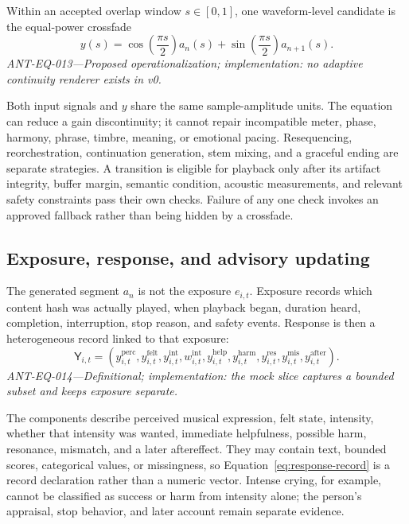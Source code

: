 Within an accepted overlap window $s\in[0,1]$, one waveform-level candidate is
the equal-power crossfade
\begin{equation}
  y(s)
  = \cos\!\left(\frac{\pi s}{2}\right)a_n(s)
  + \sin\!\left(\frac{\pi s}{2}\right)a_{n+1}(s).
  \label{eq:equal-power-crossfade}
\end{equation}
\noindent\textit{ANT-EQ-013---Proposed operationalization; implementation:
no adaptive continuity renderer exists in v0.}

Both input signals and $y$ share the same sample-amplitude units. The equation
can reduce a gain discontinuity; it cannot repair incompatible meter, phase,
harmony, phrase, timbre, meaning, or emotional pacing. Resequencing,
reorchestration, continuation generation, stem mixing, and a graceful ending
are separate strategies. A transition is eligible for playback only after its
artifact integrity, buffer margin, semantic condition, acoustic measurements,
and relevant safety constraints pass their own checks. Failure of any one
check invokes an approved fallback rather than being hidden by a crossfade.


\subsection{Exposure, response, and advisory updating}
\label{sec:design-response-update}

The generated segment $a_n$ is not the exposure $e_{i,t}$. Exposure records
which content hash was actually played, when playback began, duration heard,
completion, interruption, stop reason, and safety events. Response is then a
heterogeneous record linked to that exposure:
\begin{equation}
  \mathsf{Y}_{i,t} =
  \left(
    y^{\mathrm{perc}}_{i,t},
    y^{\mathrm{felt}}_{i,t},
    y^{\mathrm{int}}_{i,t},
    w^{\mathrm{int}}_{i,t},
    y^{\mathrm{help}}_{i,t},
    y^{\mathrm{harm}}_{i,t},
    y^{\mathrm{res}}_{i,t},
    y^{\mathrm{mis}}_{i,t},
    y^{\mathrm{after}}_{i,t}
  \right).
  \label{eq:response-record}
\end{equation}
\noindent\textit{ANT-EQ-014---Definitional; implementation: the mock slice
captures a bounded subset and keeps exposure separate.}

The components describe perceived musical expression, felt state, intensity,
whether that intensity was wanted, immediate helpfulness, possible harm,
resonance, mismatch, and a later aftereffect. They may contain text, bounded
scores, categorical values, or missingness, so Equation~\ref{eq:response-record}
is a record declaration rather than a numeric vector. Intense crying, for
example, cannot be classified as success or harm from intensity alone; the
person's appraisal, stop behavior, and later account remain separate evidence.

